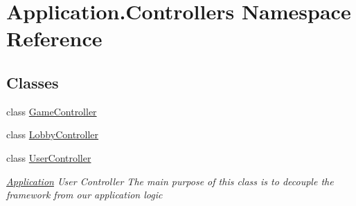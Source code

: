 \hypertarget{namespace_application_1_1_controllers}{}\section{Application.\+Controllers Namespace Reference}
\label{namespace_application_1_1_controllers}
\subsection*{Classes}
\begin{DoxyCompactItemize}
\item 
class \mbox{\hyperlink{class_application_1_1_controllers_1_1_game_controller}{Game\+Controller}}
\item 
class \mbox{\hyperlink{class_application_1_1_controllers_1_1_lobby_controller}{Lobby\+Controller}}
\item 
class \mbox{\hyperlink{class_application_1_1_controllers_1_1_user_controller}{User\+Controller}}
\begin{DoxyCompactList}\small\item\em \mbox{\hyperlink{namespace_application}{Application}} User Controller The main purpose of this class is to decouple the framework from our application logic \end{DoxyCompactList}\end{DoxyCompactItemize}
